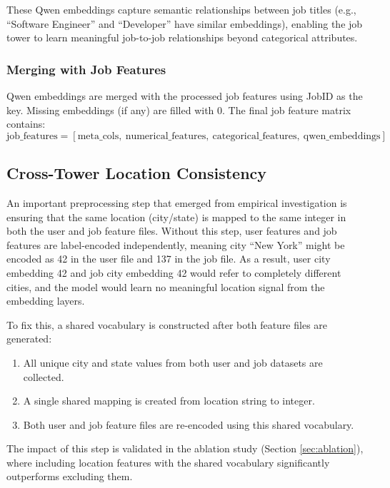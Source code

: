 These Qwen embeddings capture semantic relationships between job titles (e.g., ``Software Engineer'' and ``Developer'' have similar embeddings), enabling the job tower to learn meaningful job-to-job relationships beyond categorical attributes.

\subsubsection{Merging with Job Features}
Qwen embeddings are merged with the processed job features using JobID as the key. Missing embeddings (if any) are filled with 0. The final job feature matrix contains:
\begin{equation}
\text{job\_features} = [\text{meta\_cols},\ \text{numerical\_features},\ \text{categorical\_features},\ \text{qwen\_embeddings}]
\end{equation}

\subsection{Cross-Tower Location Consistency}
\label{sec:location_encoding}

An important preprocessing step that emerged from empirical investigation is ensuring that the same location (city/state) is mapped to the same integer in both the user and job feature files. Without this step, user features and job features are label-encoded independently, meaning city ``New York'' might be encoded as 42 in the user file and 137 in the job file. As a result, user city embedding 42 and job city embedding 42 would refer to completely different cities, and the model would learn no meaningful location signal from the embedding layers.

To fix this, a shared vocabulary is constructed after both feature files are generated:
\begin{enumerate}
    \item All unique city and state values from both user and job datasets are collected.
    \item A single shared mapping is created from location string to integer.
    \item Both user and job feature files are re-encoded using this shared vocabulary.
\end{enumerate}

The impact of this step is validated in the ablation study (Section \ref{sec:ablation}), where including location features with the shared vocabulary significantly outperforms excluding them.

